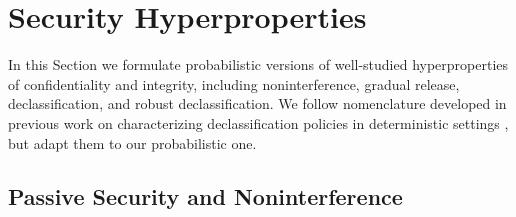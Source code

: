 \section{Security Hyperproperties}

In this Section we formulate probabilistic versions of well-studied
hyperproperties of confidentiality and integrity, including
noninterference, gradual release, declassification, and robust
declassification.  We follow nomenclature developed in previous work
on characterizing declassification policies in deterministic settings
\cite{sabelfeld2009declassification}, but adapt them to our
probabilistic one.



\subsection{Passive Security and Noninterference}

